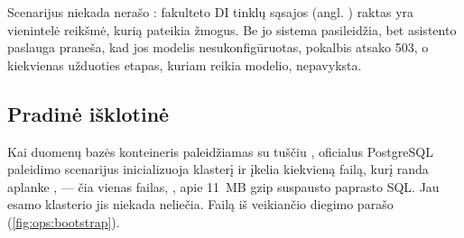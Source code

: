 Scenarijus niekada nerašo : fakulteto DI tinklų sąsajos (angl.
) raktas yra vienintelė reikšmė, kurią pateikia žmogus. Be jo sistema pasileidžia,
bet asistento paslauga praneša, kad jos modelis nesukonfigūruotas, pokalbis atsako 503, o
kiekvienas užduoties etapas, kuriam reikia modelio, nepavyksta.

\subsection{Pradinė išklotinė}\label{sec:ops:bootstrap}

Kai duomenų bazės konteineris paleidžiamas su tuščiu , oficialus PostgreSQL
paleidimo scenarijus inicializuoja klasterį ir įkelia kiekvieną failą, kurį randa aplanke
, --- čia vienas failas, , apie
11~MB gzip suspausto paprasto SQL. Jau esamo klasterio jis niekada neliečia. Failą iš veikiančio
diegimo parašo  (\cref{fig:ops:bootstrap}).

